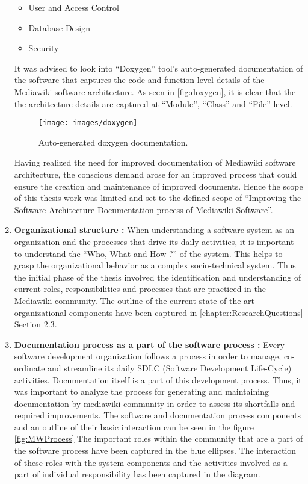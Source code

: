 \begin{enumerate}
\begin{itemize}
\item User and Access Control
\item Database Design
\item Security
\end{itemize}
It was advised to look into \enquote{Doxygen} tool's auto-generated documentation of the software that captures the code and function level details of the Mediawiki software architecture.
As seen in \autoref{fig:doxygen}, it is clear that the the architecture details are captured at \enquote{Module}, \enquote{Class} and \enquote{File} level.
\vspace{10mm}
\begin{figure}[H]
  \centering
  \texttt{[image: images/doxygen]}
  \caption[Auto-generated doxygen documentation]{Auto-generated doxygen documentation.}\label{fig:doxygen}
\end{figure}
Having realized the need for improved documentation of Mediawiki software architecture, the conscious demand arose for an improved process that could ensure the creation and maintenance of improved documents. Hence the scope of this thesis work was limited and set to the defined scope of \enquote{Improving the Software Architecture Documentation process of Mediawiki Software}.
\item \textbf{Organizational structure : } When understanding a software system as an organization and the processes that drive its daily activities, it is important to understand the \enquote{Who, What and How ?} of the system. This helps to grasp the organizational behavior as a complex socio-technical system. Thus the initial phase of the thesis involved the identification and understanding of current roles, responsibilities and processes that are practiced in the Mediawiki community. The outline of the current state-of-the-art organizational components have been captured in \autoref{chapter:ResearchQuestions} Section 2.3. 
\item \textbf{Documentation process as a part of the software process : } Every software development organization follows a process in order to manage, co-ordinate and streamline its daily SDLC (Software Development Life-Cycle) activities. Documentation itself is a part of this development process. Thus, it was important to analyze the process for generating and maintaining documentation by mediawiki community in order to assess its shortfalls and required improvements.
\indent The software and documentation process components and an outline of their basic interaction can be seen in the figure \autoref{fig:MWProcess}  The important roles within the community that are a part of the software process have been captured in the blue ellipses. The interaction of these roles with the system components and the activities involved as a part of individual responsibility has been captured in the diagram. 

\end{enumerate}
